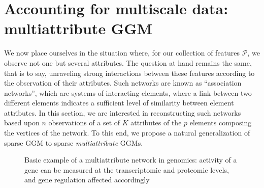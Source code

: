 \section{Accounting for multiscale data: multiattribute GGM}
\label{sec:multiattribute_ggm}

We now place  ourselves in the situation where, for  our collection of
features $\mathcal{P}$, we observe not one but several attributes. The
question at hand  remains the same, that is to  say, unraveling strong
interactions between  these features  according to the  observation of
their   attributes.   Such   networks  are   known  as   ``association
networks'', which  are systems of  interacting elements, where  a link
between  two  different  elements  indicates  a  sufficient  level  of
similarity  between  element  attributes.   In this  section,  we  are
interested in reconstructing such networks based upon $n$ observations
of a set of $K$ attributes  of the $p$ elements composing the vertices
of the  network. To this end,  we propose a natural  generalization of
sparse GGM to sparse \emph{multiattribute} GGMs.

\begin{figure}[htbp!]
  \centering
  \caption{Basic example of a multiattribute network in genomics:
    activity  of a  gene  can  be measured  at  the transcriptomic  and
    proteomic levels, and gene regulation affected accordingly}
\label{fig:central_dogma}
\end{figure}

